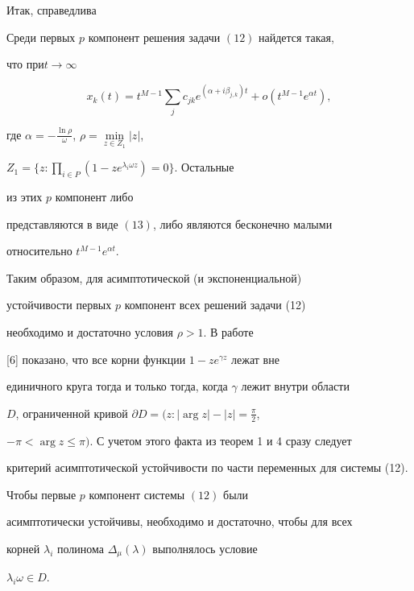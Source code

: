 


Итак, справедлива 


 


\begin{thm} 


Среди первых $p$ компонент решения задачи $(12)$ найдется такая, 


что при\linebreak $t\to\infty$ 


\begin{equation} 


x_k(t)=t^{M-1}\sum_j c_{jk}e^{(\alpha+i\beta_{j,k})t} 


+o(t^{M-1}e^{\alpha t}), 


\end{equation} 


где $\alpha=-\frac{\ln\rho}{\omega}$, $\rho=\min\limits_{z\in Z_1}|z|$, 


$Z_1=\Big\{z:\prod\limits_{i\in P}(1-z e^{\lambda_i\omega z})=0\Big\}$. Остальные 


из этих $p$ компонент либо 


представляются в виде $(13)$, либо являются бесконечно малыми 


относительно $t^{M-1}e^{\alpha t}$. 


\end{thm} 


 


 


Таким образом, для асимптотической (и экспоненциальной) 


устойчивости первых $p$ компонент всех решений задачи (12) 


необходимо и достаточно условия $\rho>1$. В работе 


[6] показано, что все корни функции $1-z e^{\gamma z}$ лежат вне 


единичного круга тогда и только тогда, когда $\gamma$ лежит внутри области 


$D$, ограниченной кривой $\partial D=\big(z:|\arg z|-|z|= \frac{\pi}{2}$, 


$-\pi<\arg z\le\pi\big)$. С учетом этого факта из теорем 1 и 4 сразу следует 


критерий асимптотической устойчивости по части переменных для системы (12). 


 


\begin{thm} 


Чтобы первые $p$ компонент системы $(12)$ были 


асимптотически устойчивы, необходимо и достаточно, чтобы для всех 


корней $\lambda_i$ полинома $\Delta_\mu(\lambda)$ выполнялось условие \linebreak


$\lambda_i\omega\in D$. 


\end{thm} 


